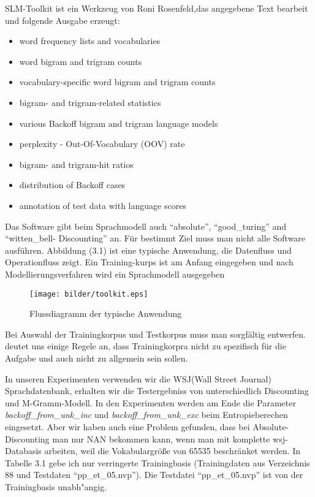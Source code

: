 SLM-Toolkit ist ein Werkzeug von Roni Rosenfeld,das angegebene Text bearbeit und folgende Ausgabe erzeugt\cite{int_slm_toolkit}:
\begin{itemize}
	\item word frequency lists and vocabularies
	\item word bigram and trigram counts
	\item vocabulary-specific word bigram and trigram counts
	\item bigram- and trigram-related statistics
	\item various Backoff bigram and trigram language models
	\item perplexity - Out-Of-Vocabulary (OOV) rate 
	\item bigram- and trigram-hit ratios
	\item distribution of Backoff cases 
	\item annotation of test data with language scores 
\end{itemize}

Das Software gibt beim Sprachmodell auch "`absolute"', "`good\_turing"' and "`witten\_bell- Discounting"' an.
F\"ur bestimmt Ziel muss man nicht alle Software ausf\"uhren. Abbildung (3.1) ist eine typische Anwendung, die Datenfluss und Operationfluss zeigt.
Ein Training-kurps ist am Anfang eingegeben und nach Modellierungsverfahren wird ein Sprachmodell ausgegeben


\begin{figure}[h]
	\texttt{[image: bilder/toolkit.eps]}
	 \caption{Flussdiagramm der typische Anwendung}
  \label{fig:figure_2}
\end{figure}

Bei Auswahl der Trainingkorpus und Testkorpus muss man sorgf\"altig entwerfen. \cite{book_speech} deutet uns einige Regele an, dass Trainingkorpra nicht zu spezifisch f\"ur die Aufgabe und auch nicht zu allgemein sein sollen.  

In unseren Experimenten verwenden wir die WSJ(Wall Street Journal) Sprachdatenbank, erhalten wir die Testergebniss von unterschiedlich Discounting und M-Gramm-Modell. In den Experimenten werden am Ende die Parameter \emph{backoff\_from\_unk\_inc} und \emph{backoff\_from\_unk\_exc} beim Entropieberechen eingesetzt.  
 Aber wir haben auch eine Problem gefunden, dass bei Absolute-Discounting man nur NAN bekommen kann, wenn man mit komplette wsj-Databasis arbeiten, weil die Vokabulargr\"o\ss e von 65535 beschr\"anket werden. In Tabelle 3.1 gebe ich nur verringerte Trainingbasis (Trainingdaten aus Verzeichnis 88 und Testdaten "`pp\_et\_05.nvp"'). Die Testdatei "`pp\_et\_05.nvp"' ist von der Trainingbasis unabh"angig.
 
